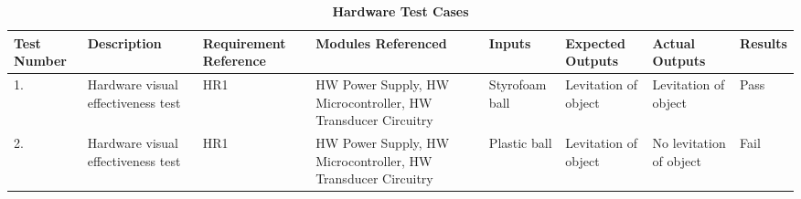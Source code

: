 \documentclass[12pt, titlepage]{article}
\begin{document}
\begin{table}[H]
\caption{\bf Hardware Test Cases}
\begin{tabular}{ |p{1cm}|p{2.2cm}|p{2.4cm}|p{2cm}|p{1.7cm}|p{1.7cm}|p{1.7cm}|p{1.3cm}|  } 
 \hline
\bf Test Number & \bf Description & \bf Requirement Reference & \bf Modules Referenced & \bf Inputs & \bf Expected Outputs & \bf Actual Outputs & \bf Results\\
 \hline
 1. & Hardware visual effectiveness test & HR1 & HW Power Supply, HW Microcontroller, HW Transducer Circuitry & Styrofoam ball & Levitation of object & Levitation of object & Pass\\
 \hline
 2. & Hardware visual effectiveness test & HR1 & HW Power Supply, HW Microcontroller, HW Transducer Circuitry & Plastic ball & Levitation of object & No levitation of object  & Fail\\
 \hline
\end{tabular}
\end{table}
\end{document}
